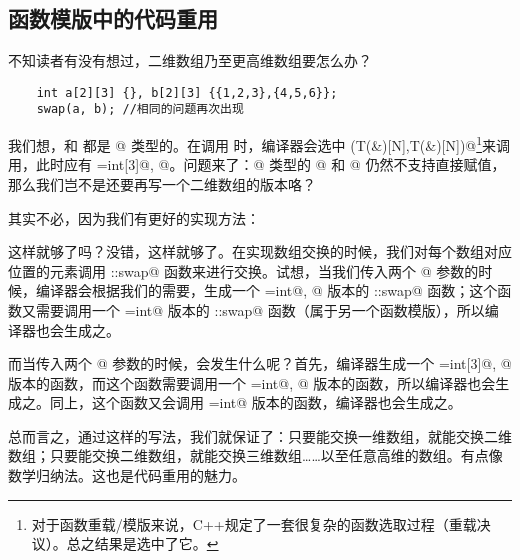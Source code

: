 \subsection*{函数模版中的代码重用}
不知读者有没有想过，二维数组乃至更高维数组要怎么办？
\begin{lstlisting}
    int a[2][3] {}, b[2][3] {{1,2,3},{4,5,6}};
    swap(a, b); //相同的问题再次出现
\end{lstlisting}\par
我们想，\lstinline@a@ 和 \lstinline@b@ 都是 \lstinline@int[2][3]@ 类型的。在调用 \lstinline@swap@ 时，编译器会选中 \lstinline@swap(T(&)[N],T(&)[N])@\footnote{对于函数重载/模版来说，C++规定了一套很复杂的函数选取过程（重载决议）。总之结果是选中了它。}来调用，此时应有 \lstinline@T=int[3]@, @。问题来了：\lstinline@int[3]@ 类型的 \lstinline@a[i]@ 和 \lstinline@b[i]@ 仍然不支持直接赋值，那么我们岂不是还要再写一个二维数组的版本咯？\par
其实不必，因为我们有更好的实现方法：

这样就够了吗？没错，这样就够了。在实现数组交换的时候，我们对每个数组对应位置的元素调用 \lstinline@user::swap@ 函数来进行交换。试想，当我们传入两个 \lstinline@int[3]@ 参数的时候，编译器会根据我们的需要，生成一个 \lstinline@T=int@, @ 版本的 \lstinline@user::swap@ 函数；这个函数又需要调用一个 \lstinline@T=int@ 版本的 \lstinline@user::swap@ 函数（属于另一个函数模版），所以编译器也会生成之。\par
而当传入两个 \lstinline@int[2][3]@ 参数的时候，会发生什么呢？首先，编译器生成一个 \lstinline@T=int[3]@, @ 版本的函数，而这个函数需要调用一个 \lstinline@T=int@, @ 版本的函数，所以编译器也会生成之。同上，这个函数又会调用 \lstinline@T=int@ 版本的函数，编译器也会生成之。\par
总而言之，通过这样的写法，我们就保证了：只要能交换一维数组，就能交换二维数组；只要能交换二维数组，就能交换三维数组……以至任意高维的数组。有点像数学归纳法。这也是代码重用的魅力。\par
